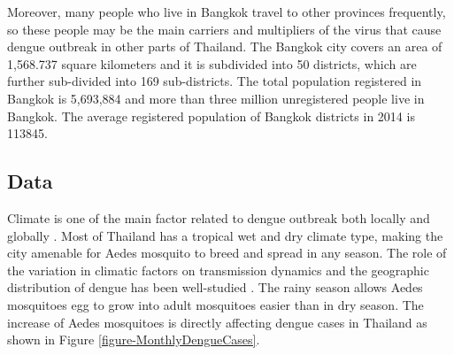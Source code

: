 \documentclass{bmcart}
\begin{document}
Moreover, many people who live in Bangkok travel to other provinces frequently, so these people may be the main carriers and multipliers of the virus that cause dengue outbreak in other parts of Thailand. The Bangkok city covers an area of 1,568.737 square kilometers and it is subdivided into 50 districts, which are further sub-divided into 169 sub-districts. The total population registered in Bangkok is 5,693,884 and more than three million unregistered people live in Bangkok. The average registered population of Bangkok districts in 2014 is 113845. 




\subsection{Data}

Climate is one of the main factor related to dengue outbreak both locally and globally \cite{johansson2009multiyear, morin2013climate}. Most of Thailand has a tropical wet and dry climate type, making the city amenable for Aedes mosquito to breed and spread in any season. The role of the variation in climatic factors on transmission dynamics and the geographic distribution of dengue has been well-studied \cite{thai2011role}. The rainy season allows Aedes mosquitoes egg to grow into adult mosquitoes easier than in dry season. The increase of Aedes mosquitoes is directly affecting dengue cases in Thailand as shown in Figure \ref{figure-MonthlyDengueCases}.
\end{document}
